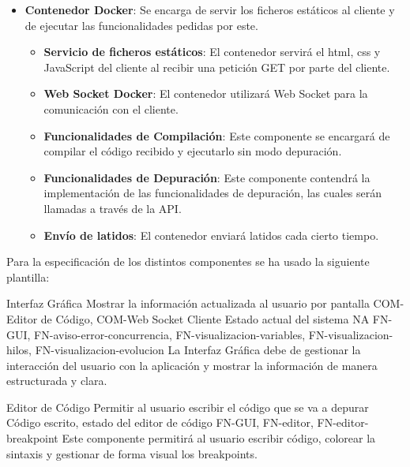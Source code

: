 \begin{itemize}
    \item \textbf{Contenedor Docker}: Se encarga de servir los ficheros estáticos al cliente y de ejecutar las funcionalidades pedidas por este.
    \begin{itemize}
        \item \textbf{Servicio de ficheros estáticos}: El contenedor servirá el html, css y JavaScript del cliente al recibir una petición GET por parte del cliente.
        \item \textbf{Web Socket Docker}: El contenedor utilizará Web Socket para la comunicación con el cliente.
        \item \textbf{Funcionalidades de Compilación}: Este componente se encargará de compilar el código recibido y ejecutarlo sin modo depuración.
        \item \textbf{Funcionalidades de Depuración}: Este componente contendrá la implementación de las funcionalidades de depuración, las cuales serán llamadas a través de la API.
        \item \textbf{Envío de latidos}: El contenedor enviará latidos cada cierto tiempo.
    \end{itemize}
\end{itemize}


Para la especificación de los distintos componentes se ha usado la siguiente plantilla: 

\printcomptemplate
\begin{component}{Interfaz Gráfica}
{Mostrar la información actualizada al usuario por pantalla}
{COM-Editor de Código, COM-Web Socket Cliente} %
{Estado actual del sistema} %
{NA} %
{FN-GUI, FN-aviso-error-concurrencia, FN-visualizacion-variables, FN-visualizacion-hilos, FN-visualizacion-evolucion} %
La Interfaz Gráfica debe de gestionar la interacción del usuario con la aplicación y mostrar la información de manera estructurada y clara. %
\end{component}

\begin{component}{Editor de Código}
    {Permitir al usuario escribir el código que se va a depurar}
    {\NA} %
    {\NA} %
    {Código escrito, estado del editor de código} %
    {FN-GUI, FN-editor, FN-editor-breakpoint} %
    Este componente permitirá al usuario escribir código, colorear la sintaxis y gestionar de forma visual los breakpoints. %
\end{component}

